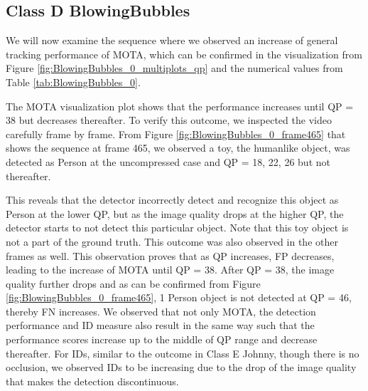 \subsection{Class D BlowingBubbles}
We will now examine the sequence where we observed an increase of general tracking performance of MOTA, which can be confirmed in the visualization from Figure \ref{fig:BlowingBubbles_0_multiplots_qp} and the numerical values from Table \ref{tab:BlowingBubbles_0}.


The MOTA visualization plot shows that the performance increases until QP = 38 but decreases thereafter. To verify this outcome, we inspected the video carefully frame by frame. From Figure \ref{fig:BlowingBubbles_0_frame465} that shows the sequence at frame 465, we observed a toy, the humanlike object, was detected as Person at the uncompressed case and QP = 18, 22, 26 but not thereafter.

This reveals that the detector incorrectly detect and recognize this object as Person at the lower QP, but as the image quality drops at the higher QP, the detector starts to not detect this particular object. Note that this toy object is not a part of the ground truth. This outcome was also observed in the other frames as well. This observation proves that as QP increases, FP decreases, leading to the increase of MOTA until QP = 38. After QP = 38, the image quality further drops and as can be confirmed from Figure \ref{fig:BlowingBubbles_0_frame465}, 1 Person object is not detected at QP = 46, thereby FN increases. We observed that not only MOTA, the detection performance and ID measure also result in the same way such that the performance scores increase up to the middle of QP range and decrease thereafter. For IDs, similar to the outcome in Class E Johnny, though there is no occlusion, we observed IDs to be increasing due to the drop of the image quality that makes the detection discontinuous.


